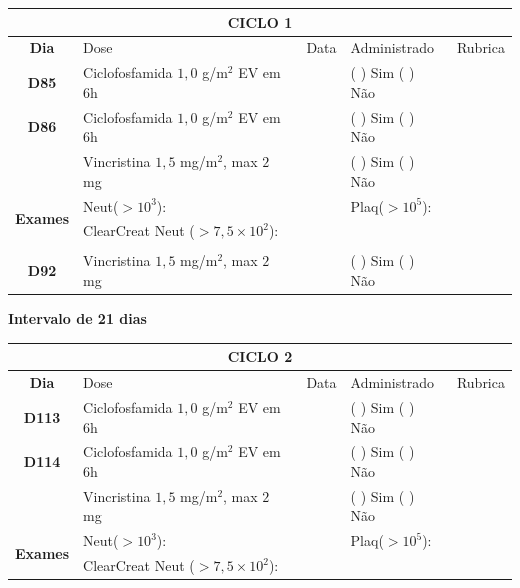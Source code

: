 \documentclass[11pt,a4paper,oldfontcommands]{memoir}
\begin{document}
\begin{center}
    \begin{longtable}{p{1cm}p{5cm}|p{1cm}|p{4cm}|p{2.5cm}}
    \hline
	\multicolumn{5}{c}{\textbf{CICLO 1}}\\
	\hline
    \multicolumn{1}{c|}{\multirow{1}{*}{\textbf{Dia}}}&{Dose}&{Data}&{Administrado}&{Rubrica} \\
    \hline
    \multicolumn{1}{c|}{\multirow{1}{*}{\textbf{D85}}}&{Ciclofosfamida \(1,0\) g/m\(^2\) EV em 6h}&&{(  ) Sim (  ) Não}&\\
    \multicolumn{1}{c|}{\multirow{1}{*}{\textbf{D86}}}&{Ciclofosfamida \(1,0\) g/m\(^2\) EV em 6h}&&{(  ) Sim (  ) Não}&\\
    \multicolumn{1}{c|}{\multirow{1}{*}{\textbf{}}}&{Vincristina \(1,5\) mg/m\(^2\), max \(2\) mg}&&{(  ) Sim (  ) Não}&\\
    \hline
    \multicolumn{1}{c|}{\multirow{2}{*}{\textbf{Exames}}}&\multicolumn{2}{l|}{Neut(\(>10^3\)):}&{Plaq(\(>10^5\)):}&\\
    \cline{2-5}
    \multicolumn{1}{c|}{\multirow{2}{*}{{}}}&\multicolumn{2}{l|}{ClearCreat Neut (\(>7,5\times10^2\)):}&{}&{}\\
    \hline
    \\
    \hline
    \multicolumn{1}{c|}{\multirow{1}{*}{\textbf{D92}}}&{Vincristina \(1,5\) mg/m\(^2\), max \(2\) mg}&&{(  ) Sim (  ) Não}&\\
    \hline
\end{longtable}
\textbf{Intervalo de 21 dias}
    \begin{longtable}{p{1cm}p{5cm}|p{1cm}|p{4cm}|p{2.5cm}}
    \hline
	\multicolumn{5}{c}{\textbf{CICLO 2}}\\
	\hline
    \multicolumn{1}{c|}{\multirow{1}{*}{\textbf{Dia}}}&{Dose}&{Data}&{Administrado}&{Rubrica} \\
    \hline
    \multicolumn{1}{c|}{\multirow{1}{*}{\textbf{D113}}}&{Ciclofosfamida \(1,0\) g/m\(^2\) EV em 6h}&&{(  ) Sim (  ) Não}&\\
    \multicolumn{1}{c|}{\multirow{1}{*}{\textbf{D114}}}&{Ciclofosfamida \(1,0\) g/m\(^2\) EV em 6h}&&{(  ) Sim (  ) Não}&\\
    \multicolumn{1}{c|}{\multirow{1}{*}{\textbf{}}}&{Vincristina \(1,5\) mg/m\(^2\), max \(2\) mg}&&{(  ) Sim (  ) Não}&\\
    \hline
    \multicolumn{1}{c|}{\multirow{2}{*}{\textbf{Exames}}}&\multicolumn{2}{l|}{Neut(\(>10^3\)):}&{Plaq(\(>10^5\)):}&\\
    \cline{2-5}
    \multicolumn{1}{c|}{\multirow{2}{*}{{}}}&\multicolumn{2}{l|}{ClearCreat Neut (\(>7,5\times10^2\)):}&{}&{}\\

\end{longtable}
\end{center}
\end{document}
